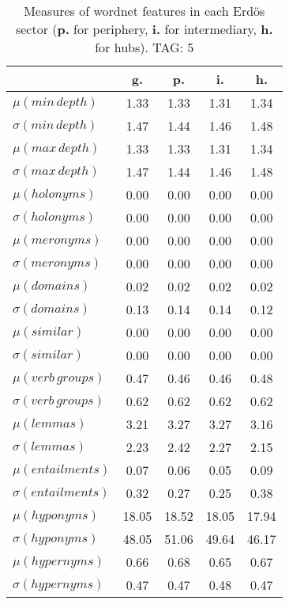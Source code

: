 \begin{table}[h!]
\begin{center}
\begin{tabular}{| l || c | c | c | c |}\hline
 & {\bf g.} & {\bf p.} & {\bf i.} & {\bf h.} \\\hline\hline
$\mu(min\,depth)$ & 1.33  & 1.33  & 1.31  & 1.34 \\
$\sigma(min\,depth)$ & 1.47  & 1.44  & 1.46  & 1.48 \\\hline
$\mu(max\,depth)$ & 1.33  & 1.33  & 1.31  & 1.34 \\
$\sigma(max\,depth)$ & 1.47  & 1.44  & 1.46  & 1.48 \\\hline
$\mu(holonyms)$ & 0.00  & 0.00  & 0.00  & 0.00 \\
$\sigma(holonyms)$ & 0.00  & 0.00  & 0.00  & 0.00 \\\hline
$\mu(meronyms)$ & 0.00  & 0.00  & 0.00  & 0.00 \\
$\sigma(meronyms)$ & 0.00  & 0.00  & 0.00  & 0.00 \\\hline
$\mu(domains)$ & 0.02  & 0.02  & 0.02  & 0.02 \\
$\sigma(domains)$ & 0.13  & 0.14  & 0.14  & 0.12 \\\hline
$\mu(similar)$ & 0.00  & 0.00  & 0.00  & 0.00 \\
$\sigma(similar)$ & 0.00  & 0.00  & 0.00  & 0.00 \\\hline
$\mu(verb\,groups)$ & 0.47  & 0.46  & 0.46  & 0.48 \\
$\sigma(verb\,groups)$ & 0.62  & 0.62  & 0.62  & 0.62 \\\hline
$\mu(lemmas)$ & 3.21  & 3.27  & 3.27  & 3.16 \\
$\sigma(lemmas)$ & 2.23  & 2.42  & 2.27  & 2.15 \\\hline
$\mu(entailments)$ & 0.07  & 0.06  & 0.05  & 0.09 \\
$\sigma(entailments)$ & 0.32  & 0.27  & 0.25  & 0.38 \\\hline
$\mu(hyponyms)$ & 18.05  & 18.52  & 18.05  & 17.94 \\
$\sigma(hyponyms)$ & 48.05  & 51.06  & 49.64  & 46.17 \\\hline
$\mu(hypernyms)$ & 0.66  & 0.68  & 0.65  & 0.67 \\
$\sigma(hypernyms)$ & 0.47  & 0.47  & 0.48  & 0.47 \\\hline
\end{tabular}
\caption{Measures of wordnet features in each Erd\"os sector ({{\bf p.}} for periphery, {{\bf i.}} for intermediary, {{\bf h.}} for hubs). TAG: 5}
\end{center}
\end{table}